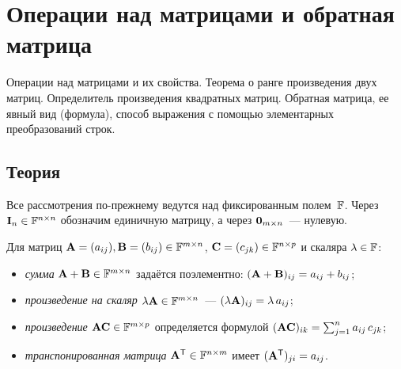 
\section{Операции над матрицами и обратная матрица}
\label{sec:1.1.03-matrix-operations}

\begin{ticket}
Операции над матрицами и их свойства. Теорема о ранге произведения двух матриц. Определитель произведения квадратных матриц. Обратная матрица, ее явный вид (формула), способ выражения с помощью элементарных преобразований строк.
\end{ticket}

\subsection*{Теория}

Все рассмотрения по-прежнему ведутся над фиксированным полем~$\mathbb{F}$.
Через $\mathbf{I}_n \in \mathbb{F}^{n \times n}$ обозначим единичную матрицу,
а через $\mathbf{0}_{m \times n}$~--- нулевую.

\begin{definition}
\label{def:matrix-ops}
Для матриц
$\mathbf{A} = (a_{ij}), \mathbf{B} = (b_{ij}) \in \mathbb{F}^{m \times n}$,
$\mathbf{C} = (c_{jk}) \in \mathbb{F}^{n \times p}$ и скаляра $\lambda \in \mathbb{F}$:
\begin{itemize}
  \item \emph{сумма} $\mathbf{A} + \mathbf{B} \in \mathbb{F}^{m \times n}$ задаётся
        поэлементно: $(\mathbf{A} + \mathbf{B})_{ij} = a_{ij} + b_{ij}$;
  \item \emph{произведение на скаляр}
        $\lambda \mathbf{A} \in \mathbb{F}^{m \times n}$~---
        $(\lambda \mathbf{A})_{ij} = \lambda \, a_{ij}$;
  \item \emph{произведение} $\mathbf{A}\mathbf{C} \in \mathbb{F}^{m \times p}$
        определяется формулой
        $(\mathbf{A}\mathbf{C})_{ik} = \sum_{j=1}^{n} a_{ij}\,c_{jk}$;
  \item \emph{транспонированная матрица}
        $\mathbf{A}^{\mathsf{T}} \in \mathbb{F}^{n \times m}$ имеет
        $(\mathbf{A}^{\mathsf{T}})_{ji} = a_{ij}$.
\end{itemize}
\end{definition}

